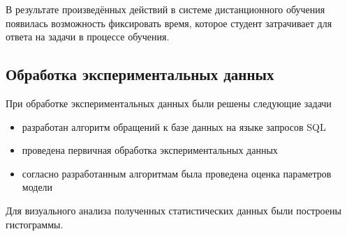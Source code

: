 В результате произведённых действий в системе дистанционного обучения появилась возможность фиксировать время, которое студент затрачивает для ответа на задачи в процессе обучения.

\subsection{Обработка экспериментальных данных}

При обработке экспериментальных данных были решены следующие задачи

\begin{itemize}
\item разработан алгоритм обращений к базе данных на языке запросов SQL
\item проведена первичная обработка экспериментальных данных
\item согласно разработанным алгоритмам была проведена оценка параметров модели
\end{itemize}

Для визуального анализа полученных статистических данных были построены гисто\-граммы.